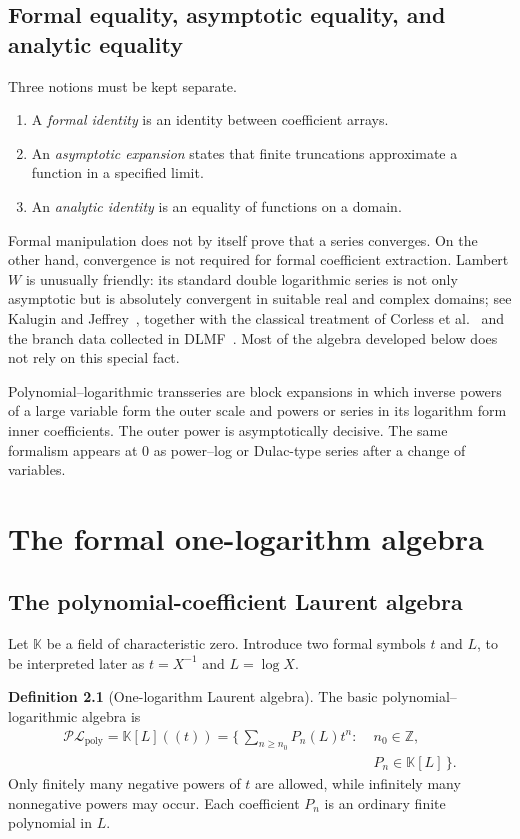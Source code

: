 \documentclass[11pt,oneside]{book}
\theoremstyle{definition}
\newtheorem{definition}[theorem]{Definition}
\theoremstyle{remark}
\newcommand{\K}{\mathbb K}
\newcommand{\Z}{\mathbb Z}
\newcommand{\PLpoly}{\mathscr{PL}_{\mathrm{poly}}}
\begin{document}
\section{Formal equality, asymptotic equality, and analytic equality}
Three notions must be kept separate.
\begin{enumerate}
\item A \emph{formal identity} is an identity between coefficient arrays.
\item An \emph{asymptotic expansion} states that finite truncations approximate
      a function in a specified limit.
\item An \emph{analytic identity} is an equality of functions on a domain.
\end{enumerate}
Formal manipulation does not by itself prove that a series converges.  On the
other hand, convergence is not required for formal coefficient extraction.
Lambert $W$ is unusually friendly: its standard double logarithmic series is
not only asymptotic but is absolutely convergent in suitable real and complex
domains; see Kalugin and Jeffrey~\cite{KaluginJeffrey2012}, together with the
classical treatment of Corless et al.~\cite{Corless1996} and the branch data
collected in DLMF~\cite{DLMF413}.
Most of the algebra developed below does not rely on this special fact.

\begin{summarybox}
Polynomial--logarithmic transseries are block expansions in which inverse
powers of a large variable form the outer scale and powers or series in its
logarithm form inner coefficients.  The outer power is asymptotically decisive.
The same formalism appears at $0$ as power--log or Dulac-type series after a
change of variables.
\end{summarybox}

\chapter{The formal one-logarithm algebra}
\label{ch:formal-ring}

\section{The polynomial-coefficient Laurent algebra}
Let $\K$ be a field of characteristic zero.  Introduce two formal symbols
$t$ and $L$, to be interpreted later as $t=X^{-1}$ and $L=\log X$.

\begin{definition}[One-logarithm Laurent algebra]
The basic polynomial--logarithmic algebra is
\begin{equation}\label{eq:PL-poly-def}
 \begin{aligned}
 \PLpoly=\K[L]((t))
 =\biggl\{\,\sum_{n\ge n_0}P_n(L)t^n:\;&
 n_0\in\Z,\\[-0.2em]
 &P_n\in\K[L]\,\biggr\}.
 \end{aligned}
\end{equation}
Only finitely many negative powers of $t$ are allowed, while infinitely many
nonnegative powers may occur.  Each coefficient $P_n$ is an ordinary finite
polynomial in $L$.
\end{definition}
\end{document}
